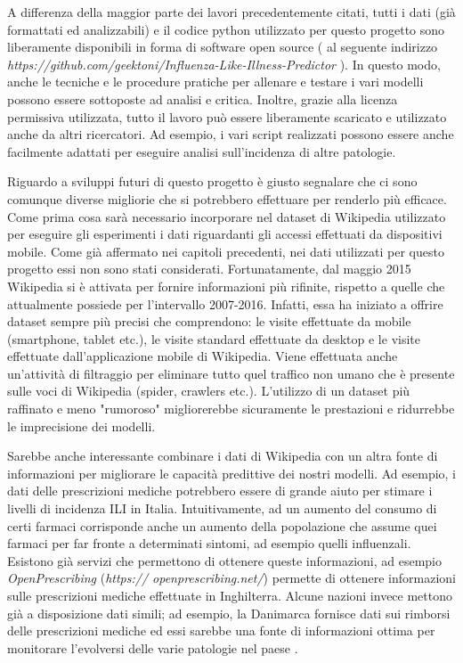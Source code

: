 A differenza della maggior parte dei lavori precedentemente citati, tutti i dati (già formattati ed analizzabili) e il codice 
python utilizzato per questo progetto sono liberamente disponibili in forma di software open source ( al seguente 
indirizzo \textit{https://github.com/geektoni/Influenza-Like-Illness-Predictor} ). In questo modo, 
anche le tecniche e le procedure pratiche per allenare e testare i vari modelli possono essere sottoposte ad analisi e 
critica. Inoltre, grazie alla licenza permissiva utilizzata, tutto il lavoro può essere liberamente scaricato e utilizzato 
anche da altri ricercatori. Ad esempio, i vari script realizzati possono essere anche facilmente adattati per eseguire
analisi sull'incidenza di altre patologie.
\bigskip

Riguardo a sviluppi futuri di questo progetto è giusto segnalare che ci sono comunque diverse migliorie che si potrebbero 
effettuare per renderlo più efficace. Come prima cosa sarà necessario incorporare nel dataset di 
Wikipedia utilizzato per eseguire gli esperimenti i dati riguardanti gli accessi effettuati da dispositivi mobile. 
Come già affermato nei capitoli precedenti, nei dati utilizzati per questo progetto essi non sono stati considerati. 
Fortunatamente, dal maggio 2015 Wikipedia si è attivata per fornire informazioni più rifinite, rispetto a quelle che 
attualmente possiede per l'intervallo 2007-2016. Infatti, essa ha iniziato a offrire dataset sempre più precisi che 
comprendono: le visite effettuate da mobile (smartphone, tablet etc.), le visite standard effettuate da desktop e le visite 
effettuate dall'applicazione mobile di Wikipedia. Viene effettuata anche un'attività di filtraggio per eliminare tutto quel 
traffico non umano che è presente sulle voci di Wikipedia (spider, crawlers etc.). L'utilizzo di un dataset più raffinato e 
meno "rumoroso" migliorerebbe sicuramente le prestazioni e ridurrebbe le imprecisione dei modelli. 
\bigskip

Sarebbe anche interessante combinare i dati di Wikipedia con un altra fonte di informazioni per migliorare le capacità 
predittive dei nostri modelli. Ad esempio, i dati delle prescrizioni mediche potrebbero essere di grande aiuto per stimare i 
livelli di incidenza ILI in Italia. Intuitivamente, ad un aumento del consumo di certi farmaci corrisponde anche un aumento 
della popolazione che assume quei farmaci per far fronte a determinati sintomi, ad esempio quelli influenzali. Esistono già 
servizi che permettono di ottenere queste informazioni, ad esempio \textit{OpenPrescribing} (\textit{https://
openprescribing.net/}) permette di ottenere informazioni sulle prescrizioni mediche effettuate in 
Inghilterra. Alcune nazioni invece mettono già a disposizione dati simili; ad esempio, la Danimarca fornisce dati sui 
rimborsi delle prescrizioni mediche ed essi sarebbe una fonte di informazioni ottima per monitorare l'evolversi delle varie 
patologie nel paese \cite{sigrun2012}.
\bigskip

